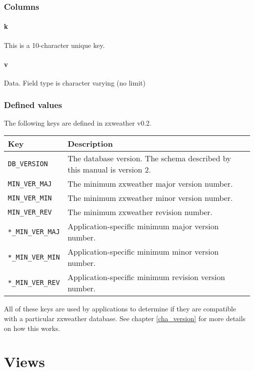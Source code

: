 \documentclass[a4paper,10pt]{book}
\begin{document}
\subsection{Columns}
\subsubsection{k}
This is a 10-character unique key.

\subsubsection{v}
Data. Field type is character varying (no limit)

\subsection{Defined values}
The following keys are defined in zxweather v0.2.

\begin{tabular}{l l}
\hline
\textbf{Key} & \textbf{Description} \\
\hline
\verb|DB_VERSION| & The database version. The schema described by this manual is version 2. \\
\verb|MIN_VER_MAJ| & The minimum zxweather major version number.\\
\verb|MIN_VER_MIN| & The minimum zxweather minor version number.\\
\verb|MIN_VER_REV| & The minimum zxweather revision number.\\
\verb|*_MIN_VER_MAJ| & Application-specific minimum major version number.\\
\verb|*_MIN_VER_MIN| & Application-specific minimum minor version number.\\
\verb|*_MIN_VER_REV| & Application-specific minimum revision version number.\\
\hline
\end{tabular}

All of these keys are used by applications to determine if they are compatible with a particular zxweather database. See chapter \ref{cha_version} for more details on how this works.

\chapter{Views}
\label{cha_views}
\end{document}
